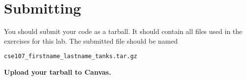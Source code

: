 \documentclass[11pt]{cselabheader}
\begin{document}
\section{Submitting}
You should submit your code as a tarball. It should contain all files
used in the exercises for this lab. The submitted file should be named
\begin{center}
  \texttt{cse107\_firstname\_lastname\_tanks.tar.gz}
\end{center}

\begin{center}
  \textbf{Upload your tarball to Canvas.}
\end{center}

\listoftheorems
\end{document}
